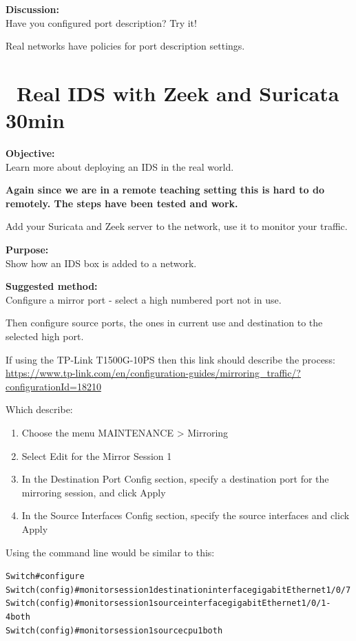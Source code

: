 \documentclass[a4paper,11pt,notitlepage]{report}
\begin{document}
{\bf Discussion:}\\
Have you configured port description? Try it!

Real networks have policies for port description settings.

\chapter{\faInfoCircle\ Real IDS with Zeek and Suricata 30min}
\label{ex:suricata-real-network}

{\bf Objective:}\\
Learn more about deploying an IDS in the real world.

{\bf Again since we are in a remote teaching setting this is hard to do remotely. The steps have been tested and work.}

Add your Suricata and Zeek server to the network, use it to monitor your traffic.

{\bf Purpose:}\\
Show how an IDS box is added to a network.

{\bf Suggested method:}\\
Configure a mirror port - select a high numbered port not in use.

Then configure source ports, the ones in current use and destination to the selected high port.

If using the TP-Link T1500G-10PS then this link should describe the process:\\
{\small\url{https://www.tp-link.com/en/configuration-guides/mirroring_traffic/?configurationId=18210}}

Which describe:
\begin{enumerate}
\item Choose the menu MAINTENANCE > Mirroring
\item Select Edit for the Mirror Session 1
\item In the Destination Port Config section, specify a destination port for the mirroring session, and click Apply
\item In the Source Interfaces Config section, specify the source interfaces and click Apply
\end{enumerate}

Using the command line would be similar to this:
\begin{alltt}
Switch#configure
Switch(config)#monitor session 1 destination interface gigabitEthernet 1/0/7
Switch(config)#monitor session 1 source interface gigabitEthernet 1/0/1-4 both
Switch(config)#monitor session 1 source cpu 1 both
\end{alltt}
\end{document}
